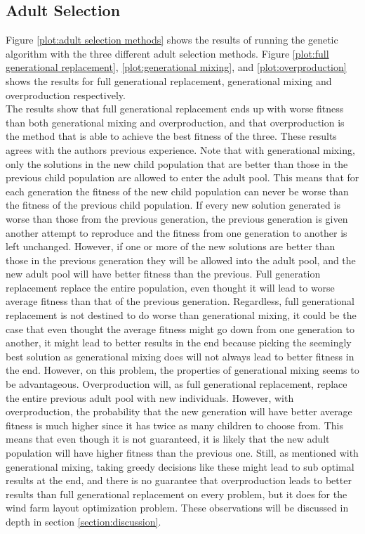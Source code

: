 \subsection{Adult Selection}
Figure \ref{plot:adult selection methods} shows the results of running the genetic algorithm with the three different adult selection methods. Figure \ref{plot:full generational replacement}, \ref{plot:generational mixing}, and \ref{plot:overproduction} shows the results for full generational replacement, generational mixing and overproduction respectively. \\

\noindent The results show that full generational replacement ends up with worse fitness than both generational mixing and overproduction, and that overproduction is the method that is able to achieve the best fitness of the three. These results agrees with the authors previous experience. Note that with generational mixing, only the solutions in the new child population that are better than those in the previous child population are allowed to enter the adult pool. This means that for each generation the fitness of the new child population can never be worse than the fitness of the previous child population. If every new solution generated is worse than those from the previous generation, the previous generation is given another attempt to reproduce and the fitness from one generation to another is left unchanged. However, if one or more of the new solutions are better than those in the previous generation they will be allowed into the adult pool, and the new adult pool will have better fitness than the previous. Full generation replacement replace the entire population, even thought it will lead to worse average fitness than that of the previous generation. Regardless, full generational replacement is not destined to do worse than generational mixing, it could be the case that even thought the average fitness might go down from one generation to another, it might lead to better results in the end because picking the seemingly best solution as generational mixing does will not always lead to better fitness in the end. However, on this problem, the properties of generational mixing seems to be advantageous. Overproduction will, as full generational replacement, replace the entire previous adult pool with new individuals. However, with overproduction, the probability that the new generation will have better average fitness is much higher since it has twice as many children to choose from. This means that even though it is not guaranteed, it is likely that the new adult population will have higher fitness than the previous one. Still, as mentioned with generational mixing, taking greedy decisions like these might lead to sub optimal results at the end, and there is no guarantee that overproduction leads to better results than full generational replacement on every problem, but it does for the wind farm layout optimization problem. These observations will be discussed in depth in section \ref{section:discussion}.


